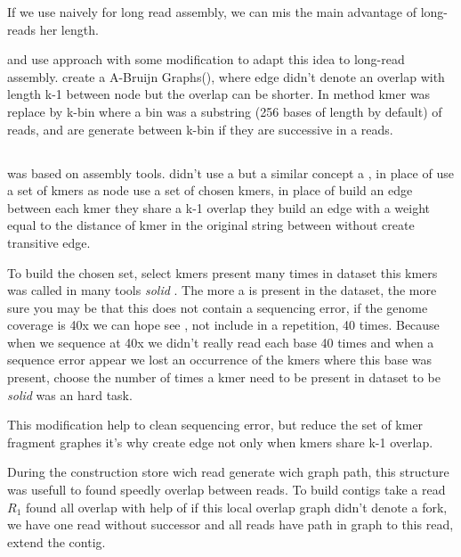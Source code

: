\documentclass[main]{subfiles}
\begin{document}
If we use \DBG naively for long read assembly, we can mis the main advantage of long-reads her length.

\flye and \wtdbg use \DBG approach with some modification to adapt this idea to long-read assembly. \flye create a A-Bruijn Graphs(), where edge didn't denote an overlap with length k-1 between node but the overlap can be shorter. In \wtdbg method kmer was replace by k-bin where a bin was a substring (256 bases of length by default) of reads, and are generate between k-bin if they are successive in a reads.

\subsection{\flye}

\flye\cite{Flye} was based on \abruijn\cite{abruijn} assembly tools. \abruijn didn't use a \DBG but a similar concept a , in place of use a set of kmers as node  use a set of chosen kmers, in place of build an edge between each kmer they share a k-1 overlap they build an edge with a weight equal to the distance of kmer in the original string between without create transitive edge.

To build the chosen \kmers set, \abruijn select kmers present many times in dataset this kmers was called in many tools \textit{solid} \kmers {} . The more a \kmers is present in the dataset, the more sure you may be that this \kmers does not contain a sequencing error, if the genome coverage is 40x we can hope see \kmer, not include in a repetition, 40 times. Because when we sequence at 40x we didn't really read each base 40 times and when a sequence error appear we lost an occurrence of the kmers where this base was present, choose the number of times a kmer need to be present in dataset to be \textit{solid} was an hard task.

This modification help to clean sequencing error, but reduce the set of kmer fragment \DBG graphes it's why  create edge not only when kmers share k-1 overlap. 

During the  construction \abruijn store wich read generate wich graph path, this structure was usefull to found speedly overlap between reads. To build contigs \abruijn take a read $R_1$ found all overlap with help of  if this local overlap graph didn't denote a fork, we have one read without successor and all reads have path in graph to this read, \abruijn extend the contig.
\end{document}
